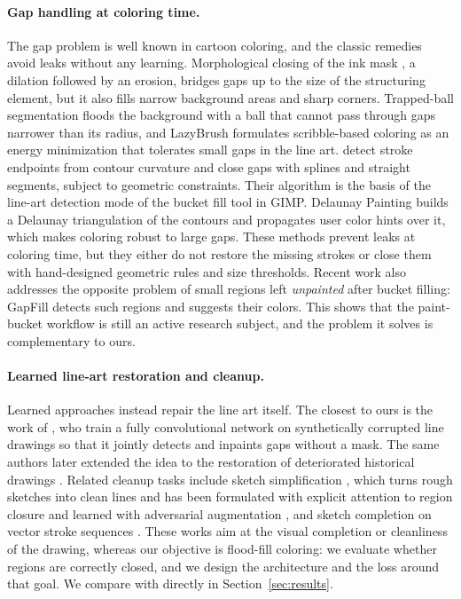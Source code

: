 \documentclass[preprint,12pt]{elsarticle}
\begin{document}
\paragraph{Gap handling at coloring time.}
The gap problem is well known in cartoon coloring, and the classic remedies avoid
leaks without any learning. Morphological closing of the ink mask
\citep{serra1982morphology,soille2003morphological}, a dilation followed by an
erosion, bridges gaps up to the size of the structuring element, but it also fills
narrow background areas and sharp corners. Trapped-ball segmentation
\citep{zhang2009vectorizing} floods the background with a ball that cannot pass
through gaps narrower than its radius, and LazyBrush \citep{sykora2009lazybrush}
formulates scribble-based coloring as an energy minimization that tolerates small
gaps in the line art. \citet{fourey2018flat} detect stroke endpoints from
contour curvature and close gaps with splines and straight segments, subject to
geometric constraints. Their algorithm is the basis of the line-art detection mode
of the bucket fill tool in GIMP. Delaunay Painting \citep{parakkat2022delaunay} builds a
Delaunay triangulation of the contours and propagates user color hints over it,
which makes coloring robust to large gaps. These methods prevent leaks at coloring
time, but they either do not restore the missing strokes or close them with
hand-designed geometric rules and size thresholds. Recent work also addresses the
opposite problem of small regions left \emph{unpainted} after bucket filling:
GapFill \citep{kono2026gapfill} detects such regions and suggests their colors. This
shows that the paint-bucket workflow is still an active research subject, and the
problem it solves is complementary to ours.

\paragraph{Learned line-art restoration and cleanup.}
Learned approaches instead repair the line art itself. The closest to ours is the
work of \citet{sasaki2017joint}, who train a fully convolutional network on
synthetically corrupted line drawings so that it jointly detects and inpaints gaps
without a mask. The same authors later extended the idea to the restoration of deteriorated
historical drawings \citep{sasaki2018restore}. Related cleanup tasks include sketch
simplification \citep{simoserra2016simplify}, which turns rough sketches into clean lines and has been formulated
with explicit attention to region closure \citep{liu2015closure} and learned with
adversarial augmentation \citep{simoserra2018mastering}, and sketch completion on
vector stroke sequences \citep{lin2020sketchbert}. These works aim at the visual
completion or cleanliness of the drawing, whereas our objective is flood-fill
coloring: we evaluate whether regions are correctly closed, and we design the
architecture and the loss around that goal. We compare with
\citet{sasaki2017joint} directly in Section~\ref{sec:results}.
\end{document}
